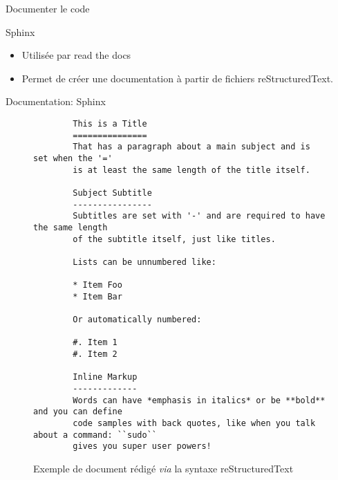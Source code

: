 \begin{frame}{Documenter le code}
  \begin{block}{Sphinx}
    \begin{itemize}
    \item Utilisée par \textsf{read the docs}
    \item Permet de créer une documentation à partir de fichiers
      \textsf{reStructuredText}.
    \end{itemize}
  \end{block}  
\end{frame}

\begin{frame}[fragile]{Documentation: Sphinx}
  \tiny
  \begin{center}
    \begin{figure}
      \begin{lstlisting}
        This is a Title
        ===============
        That has a paragraph about a main subject and is set when the '='
        is at least the same length of the title itself.

        Subject Subtitle
        ----------------
        Subtitles are set with '-' and are required to have the same length
        of the subtitle itself, just like titles.

        Lists can be unnumbered like:

        * Item Foo
        * Item Bar

        Or automatically numbered:

        #. Item 1
        #. Item 2

        Inline Markup
        -------------
        Words can have *emphasis in italics* or be **bold** and you can define
        code samples with back quotes, like when you talk about a command: ``sudo``
        gives you super user powers!
      \end{lstlisting}      
      \caption{Exemple de document rédigé \textit{via} la syntaxe \textsf{reStructuredText}}      
    \end{figure}
  \end{center}
\end{frame}
